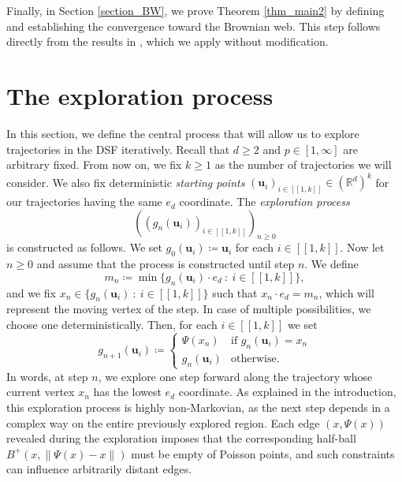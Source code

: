 \documentclass[a4paper, 11pt]{article}
\theoremstyle{plain}
\theoremstyle{definition}
\newcommand{\R}{\mathbb{R}}
\newcommand{\range}[2]{[\![#1,#2]\!]}
\numberwithin{equation}{section}
\begin{document}
Finally, in Section \ref{section_BW}, we prove Theorem \ref{thm_main2} by defining and establishing the convergence toward the Brownian web. This step follows directly from the results in \cite{Dsf2d}, which we apply without modification.


\section{The exploration process}

\label{section_exploration}

In this section, we define the central process that will allow us to explore trajectories in the DSF iteratively. Recall that $d\geq2$ and $p\in[1, \infty]$ are arbitrary fixed. From now on, we fix $k\geq1$ as the number of trajectories we will consider. We also fix deterministic \emph{starting points} $(\mathbf u_i)_{i\in\range{1}{k}}\in(\R^d)^k$ for our trajectories having the same $e_d$ coordinate. The \emph{exploration process}
    \[((g_n(\mathbf u_i))_{i\in\range{1}{k}})_{n\geq 0}\]
is constructed as follows. We set $g_0(\mathbf u_i)\coloneqq\mathbf u_i$ for each $i\in\range{1}{k}$. Now let $n\geq 0$ and assume that the process is constructed until step $n$. We define
    \[m_n\coloneqq\min\{g_n(\mathbf u_i)\cdot e_d~:~i\in\range{1}{k}\},\]
and we fix $x_n\in\{g_n(\mathbf u_i)~:~i\in\range{1}{k}\}$ such that $x_n\cdot e_d=m_n$, which will represent the moving vertex of the step. In case of multiple possibilities, we choose one deterministically. Then, for each $i\in\range{1}{k}$ we set
    \[g_{n+1}(\mathbf u_i)\coloneqq\begin{cases}
        \Psi(x_n) & \text{if $g_n(\mathbf u_i)=x_n$}\\
        g_n(\mathbf u_i) & \text{otherwise.}
    \end{cases}\]
In words, at step $n$, we explore one step forward along the trajectory whose current vertex $x_n$ has the lowest $e_d$ coordinate. As explained in the introduction, this exploration process is highly non-Markovian, as the next step depends in a complex way on the entire previously explored region. Each edge $(x,\Psi(x))$ revealed during the exploration imposes that the corresponding half-ball $B^+(x,\|\Psi(x)-x\|)$ must be empty of Poisson points, and such constraints can influence arbitrarily distant edges.\\
\end{document}
